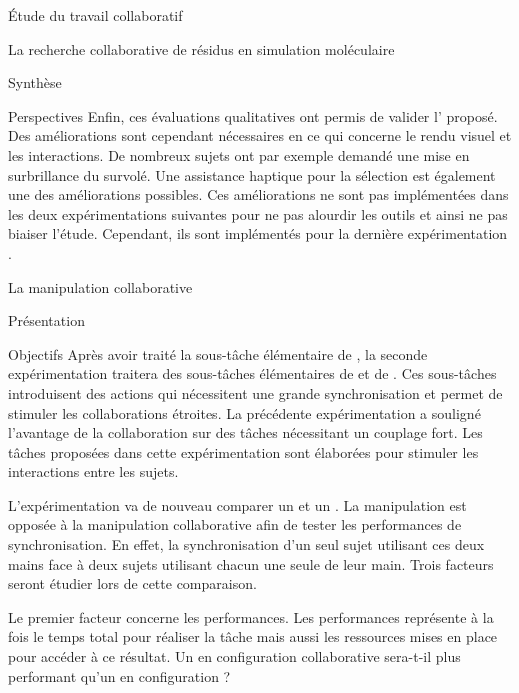 \documentclass[myfrancais]{mythesis}
\begin{document}
\begin{mypart}{Étude du travail collaboratif}
\begin{mychapter}{La recherche collaborative de résidus en simulation moléculaire}
\begin{mysection}{Synthèse}
\begin{mysubsection}{Perspectives}
					Enfin, ces évaluations qualitatives ont permis de valider l' proposé.
					Des améliorations sont cependant nécessaires en ce qui concerne le rendu visuel et les interactions.
					De nombreux sujets ont par exemple demandé une mise en surbrillance du  survolé.
					Une assistance haptique pour la sélection est également une des améliorations possibles.
					Ces améliorations ne sont pas implémentées dans les deux expérimentations suivantes pour ne pas alourdir les outils et ainsi ne pas biaiser l'étude.
					Cependant, ils sont implémentés pour la dernière expérimentation .
				\end{mysubsection}
			\end{mysection}
		\end{mychapter}
		\begin{mychapter}{La manipulation collaborative}
			\begin{mysection}{Présentation}
				\begin{mysubsection}{Objectifs}
					Après avoir traité la sous-tâche élémentaire de , la seconde expérimentation traitera des sous-tâches élémentaires de  et de  .
					Ces sous-tâches introduisent des actions qui nécessitent une grande synchronisation et permet de stimuler les collaborations étroites.
					La précédente expérimentation  a souligné l'avantage de la collaboration sur des tâches nécessitant un couplage fort.
					Les tâches proposées dans cette expérimentation sont élaborées pour stimuler les interactions entre les sujets.

					L'expérimentation va de nouveau comparer un  et un .
					La manipulation  est opposée à la manipulation collaborative afin de tester les performances de synchronisation.
					En effet, la synchronisation d'un seul sujet utilisant ces deux mains face à deux sujets utilisant chacun une seule de leur main.
					Trois facteurs seront étudier lors de cette comparaison.

					Le premier facteur concerne les performances.
					Les performances représente à la fois le temps total pour réaliser la tâche mais aussi les ressources mises en place pour accéder à ce résultat.
					Un  en configuration collaborative sera-t-il plus performant qu'un  en configuration  ?


\end{mysubsection}
\end{mysection}
\end{mychapter}
\end{mypart}
\end{document}
